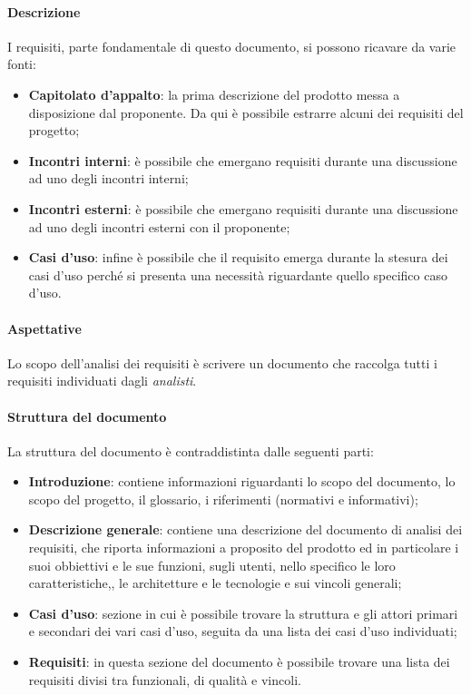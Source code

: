 \documentclass[../norme_di_progetto.tex]{subfiles}
\begin{document}
\paragraph{Descrizione}
I requisiti, parte fondamentale di questo documento, si possono ricavare da varie fonti:
\begin{itemize}
    \item \textbf{Capitolato d'appalto}: la prima descrizione del prodotto messa a disposizione dal proponente. Da qui è possibile estrarre alcuni dei requisiti del progetto;
    \item \textbf{Incontri interni}: è possibile che emergano requisiti durante una discussione ad uno degli incontri interni;
    \item \textbf{Incontri esterni}: è possibile che emergano requisiti durante una discussione ad uno degli incontri esterni con il proponente;
    \item \textbf{Casi d'uso}: infine è possibile che il requisito emerga durante la stesura dei casi d'uso perché si presenta una necessità riguardante quello specifico caso d'uso.
\end{itemize}

\paragraph{Aspettative}

Lo scopo dell'analisi dei requisiti è scrivere un documento che raccolga tutti i requisiti individuati dagli \emph{analisti}.

\paragraph{Struttura del documento}

La struttura del documento è contraddistinta dalle seguenti parti:
\begin{itemize}
    \item \textbf{Introduzione}: contiene informazioni riguardanti lo scopo del documento, lo scopo del progetto, il glossario, i riferimenti (normativi e informativi);
    \item \textbf{Descrizione generale}: contiene una descrizione del documento di analisi dei requisiti, che riporta informazioni a proposito del prodotto ed in particolare i suoi obbiettivi e le sue funzioni, sugli utenti, nello specifico le loro caratteristiche,, le architetture e le tecnologie e sui vincoli generali;
    \item \textbf{Casi d'uso}: sezione in cui è possibile trovare la struttura e gli attori primari e secondari dei vari casi d'uso, seguita da una lista dei casi d'uso individuati;
    \item \textbf{Requisiti}: in questa sezione del documento è possibile trovare una lista dei requisiti divisi tra funzionali, di qualità e vincoli.
\end{itemize}
\end{document}
